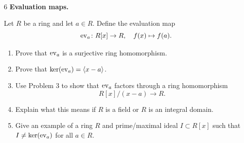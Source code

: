 \documentclass[Notebook.tex]{subfiles}
\begin{document}
\begin{problem}{6} 
    \textbf{Evaluation maps.} 
    
    Let $R$ be a ring and let $a\in R$. Define the evaluation map
    \[
    \operatorname{ev}_a \colon R[x]\to R,
    \quad
    f(x)\mapsto f(a).
    \]
    \begin{enumerate}[label=(\alph*),ref=\theenumi\alph*]
    \item Prove that $\operatorname{ev}_a$ is a surjective ring homomorphism.

    \item Prove that $\ker(\operatorname{ev}_a) = \langle x-a\rangle$.

    \item Use Problem 3 to show that $\operatorname{ev}_a$ factors through a ring homomorphism
    \[
    R[x]/(x-a)\to R.
    \]
    
    \item Explain what this means if $R$ is a field or $R$ is an integral domain.
    
    \item Give an example of a ring $R$ and prime/maximal ideal $I \subset R[x]$ such that $I \neq \ker(\operatorname{ev}_a)$ for all $a \in R$. 
\end{enumerate}
\end{problem}
\end{document}
